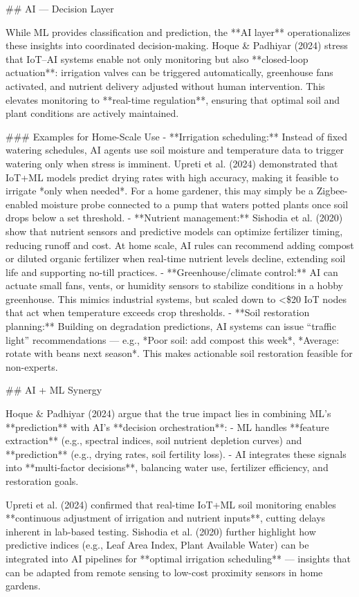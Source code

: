 \documentclass{sigchi}
\begin{document}
## AI — Decision Layer

While ML provides classification and prediction, the **AI layer** operationalizes these insights into coordinated decision-making.  
Hoque & Padhiyar (2024) stress that IoT–AI systems enable not only monitoring but also **closed-loop actuation**: irrigation valves can be triggered automatically, greenhouse fans activated, and nutrient delivery adjusted without human intervention. This elevates monitoring to **real-time regulation**, ensuring that optimal soil and plant conditions are actively maintained.

### Examples for Home-Scale Use
- **Irrigation scheduling:** Instead of fixed watering schedules, AI agents use soil moisture and temperature data to trigger watering only when stress is imminent. Upreti et al. (2024) demonstrated that IoT+ML models predict drying rates with high accuracy, making it feasible to irrigate *only when needed*. For a home gardener, this may simply be a Zigbee-enabled moisture probe connected to a pump that waters potted plants once soil drops below a set threshold.
- **Nutrient management:** Sishodia et al. (2020) show that nutrient sensors and predictive models can optimize fertilizer timing, reducing runoff and cost. At home scale, AI rules can recommend adding compost or diluted organic fertilizer when real-time nutrient levels decline, extending soil life and supporting no-till practices.
- **Greenhouse/climate control:** AI can actuate small fans, vents, or humidity sensors to stabilize conditions in a hobby greenhouse. This mimics industrial systems, but scaled down to <\$20 IoT nodes that act when temperature exceeds crop thresholds.
- **Soil restoration planning:** Building on degradation predictions, AI systems can issue “traffic light” recommendations — e.g., *Poor soil: add compost this week*, *Average: rotate with beans next season*. This makes actionable soil restoration feasible for non-experts.

## AI + ML Synergy

Hoque & Padhiyar (2024) argue that the true impact lies in combining ML’s **prediction** with AI’s **decision orchestration**:  
- ML handles **feature extraction** (e.g., spectral indices, soil nutrient depletion curves) and **prediction** (e.g., drying rates, soil fertility loss).  
- AI integrates these signals into **multi-factor decisions**, balancing water use, fertilizer efficiency, and restoration goals.  

Upreti et al. (2024) confirmed that real-time IoT+ML soil monitoring enables **continuous adjustment of irrigation and nutrient inputs**, cutting delays inherent in lab-based testing.  
Sishodia et al. (2020) further highlight how predictive indices (e.g., Leaf Area Index, Plant Available Water) can be integrated into AI pipelines for **optimal irrigation scheduling** — insights that can be adapted from remote sensing to low-cost proximity sensors in home gardens.
\end{document}
